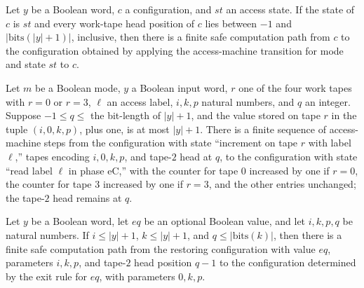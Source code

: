\begin{lemma}
\label{Complexity.LogProg.access_step}
\leanok
{}
Let $y$ be a Boolean word, $c$ a configuration, and $st$ an access state. If the state
of $c$ is $st$ and every work-tape head position of $c$ lies between $-1$ and
$|\mathrm{bits}(|y|+1)|$, inclusive, then there is a finite safe computation path from
$c$ to the configuration obtained by applying the access-machine transition for mode and
state $st$ to $c$.
\end{lemma}

\begin{lemma}
\label{Complexity.LogProg.access_inc_pointer}
\leanok
{}
Let $m$ be a Boolean mode, $y$ a Boolean input word, $r$ one of the four work tapes with
$r=0$ or $r=3$, $\ell$ an access label, $i,k,p$ natural numbers, and $q$ an integer.
Suppose $-1\le q\le$ the bit-length of $|y|+1$, and the value stored on tape $r$ in the
tuple $(i,0,k,p)$, plus one, is at most $|y|+1$. There is a finite sequence of
access-machine steps from the configuration with state “increment on tape $r$ with label
$\ell$,” tapes encoding $i,0,k,p$, and tape-$2$ head at $q$, to the configuration with
state “read label $\ell$ in phase eC,” with the counter for tape $0$ increased by one if
$r=0$, the counter for tape $3$ increased by one if $r=3$, and the other entries
unchanged; the tape-$2$ head remains at $q$.
\end{lemma}

\begin{lemma}
\label{Complexity.LogProg.access_return}
\leanok
{}
Let $y$ be a Boolean word, let $eq$ be an optional Boolean value, and let $i,k,p,q$ be
natural numbers. If $i\le |y|+1$, $k\le |y|+1$, and $q\le |\mathrm{bits}(k)|$, then
there is a finite safe computation path from the restoring configuration with value
$eq$, parameters $i,k,p$, and tape-$2$ head position $q-1$ to the configuration
determined by the exit rule for $eq$, with parameters $0,k,p$.
\end{lemma}

